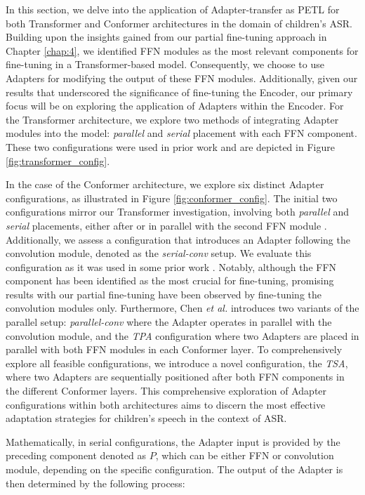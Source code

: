 In this section, we delve into the application of Adapter-transfer as \ac{PETL} for both Transformer and Conformer architectures in the domain of children's \ac{ASR}. Building upon the insights gained from our partial fine-tuning approach in Chapter \ref{chap:4}, we identified \ac{FFN} modules as the most relevant components for fine-tuning in a Transformer-based model. Consequently, we choose to use Adapters for modifying the output of these \ac{FFN} modules. Additionally, given our results that underscored the significance of fine-tuning the Encoder, our primary focus will be on exploring the application of Adapters within the Encoder. For the Transformer architecture, we explore two methods of integrating Adapter modules into the model: \textit{parallel} and \textit{serial} placement with each \ac{FFN} component. These two configurations were used in prior work \cite{he2022towards} and are depicted in Figure \ref{fig:transformer_config}.

In the case of the Conformer architecture, we explore six distinct Adapter configurations, as illustrated in Figure \ref{fig:conformer_config}. The initial two configurations mirror our Transformer investigation, involving both \textit{parallel} and \textit{serial} placements, either after or in parallel with the second \ac{FFN} module \cite{chen2023efficient}. Additionally, we assess a configuration that introduces an Adapter following the convolution module, denoted as the \textit{serial-conv} setup. We evaluate this configuration as it was used in some prior work \cite{10095837}. Notably, although the \ac{FFN} component has been identified as the most crucial for fine-tuning, promising results with our partial fine-tuning have been observed by fine-tuning the convolution modules only. Furthermore, Chen \textit{et al.} \cite{chen2023efficient} introduces two variants of the parallel setup: \textit{parallel-conv} where the Adapter operates in parallel with the convolution module, and the \textit{\ac{TPA}} configuration where two Adapters are placed in parallel with both \ac{FFN} modules in each Conformer layer. 
To comprehensively explore all feasible configurations, we introduce a novel configuration, the \textit{\ac{TSA}}, where two Adapters are sequentially positioned after both \ac{FFN} components in the different Conformer layers. 
This comprehensive exploration of Adapter configurations within both architectures aims to discern the most effective adaptation strategies for children's speech in the context of \ac{ASR}. 


Mathematically, in serial configurations, the Adapter input is provided by the preceding component denoted as $P$, which can be either \ac{FFN} or convolution module, depending on the specific configuration. The output of the Adapter is then determined by the following process:

